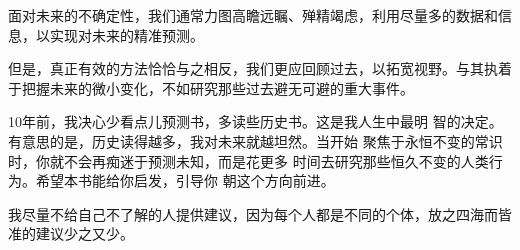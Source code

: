 %
%
%
%
%
%
%
%
%


面对未来的不确定性，我们通常力图高瞻远瞩、殚精竭虑，利用尽量多的数据和信息，以实现对未来的精准预测。

但是，真正有效的方法恰恰与之相反，我们更应回顾过去，以拓宽视野。与其执着于把握未来的微小变化，不如研究那些过去避无可避的重大事件。

10年前，我决心少看点儿预测书，多读些历史书。这是我人生中最明 智的决定。有意思的是，历史读得越多，我对未来就越坦然。当开始 聚焦于永恒不变的常识时，你就不会再痴迷于预测未知，而是花更多 时间去研究那些恒久不变的人类行为。希望本书能给你启发，引导你 朝这个方向前进。

我尽量不给自己不了解的人提供建议，因为每个人都是不同的个体，放之四海而皆准的建议少之又少。

\newpage

\nocite{*}
\printbibliography[heading=bibintoc, title=\ebibname]
\appendix

